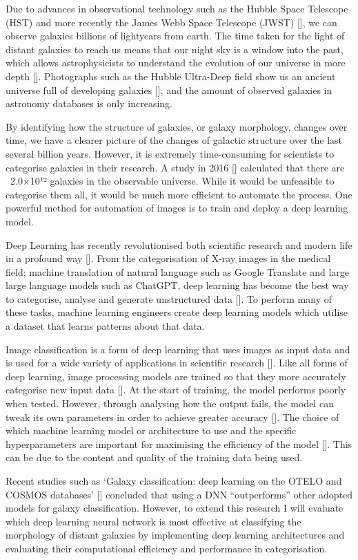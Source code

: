 \documentclass[runningheads]{llncs}
\begin{document}
Due to advances in observational technology such as the Hubble Space Telescope
(HST) and more recently the James Webb Space Telescope (JWST) [], we can observe
galaxies billions of lightyears from earth. The time taken for the light of
distant galaxies to reach us means that our night sky is a window into the
past, which allows astrophysicists to understand the evolution of our universe
in more depth []. Photographs such as the Hubble Ultra-Deep field show us an
ancient universe full of developing galaxies [], and the amount of observed
galaxies in astronomy databases is only increasing.

By identifying how the structure of galaxies, or galaxy morphology, changes over
 time, we have a clearer picture of the changes of galactic structure over the
 last several billion years. However, it is extremely time-consuming for
 scientists to categorise galaxies in their research. A study in 2016 []
 calculated that there are ~2.0×10¹² galaxies in the observable universe. While
 it would be unfeasible to categorise them all, it would be much more efficient
 to automate the process. One powerful method for automation of images is to
 train and deploy a deep learning model.

Deep Learning has recently revolutionised both scientific research and modern
life in a profound way []. From the categorisation of X-ray images in the
medical field; machine translation of natural language such as Google Translate
and large large language models such as ChatGPT, deep learning has become the
best way to categorise, analyse and generate unstructured data []. To perform
many of these tasks, machine learning engineers create deep learning models
which utilise a dataset that learns patterns about that data.

Image classification is a form of deep learning that uses images as input data
and is used for a wide variety of applications in scientific research []. Like
all forms of deep learning, image processing models are trained so that they
more accurately categorise new input data []. At the start of training, the
model performs poorly when tested. However, through analysing how the output
fails, the model can tweak its own parameters in order to achieve greater
accuracy []. The choice of which machine learning model or architecture to use
and the specific hyperparameters are important for maximising the efficiency of
the model []. This can be due to the content and quality of the training data
being used.

Recent studies such as ‘Galaxy classification: deep learning on the OTELO and
COSMOS databases’ [] concluded that using a DNN “outperforms” other adopted
models for galaxy classification. However, to extend this research I will
evaluate which deep learning neural network is most effective at classifying
the morphology of distant galaxies by implementing deep learning architectures
and evaluating their computational efficiency and performance in categorisation.
\end{document}
